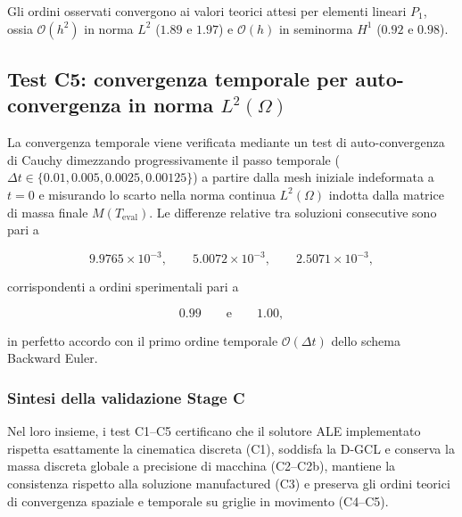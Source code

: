 Gli ordini osservati convergono ai valori teorici attesi per elementi lineari $P_1$, ossia $\mathcal{O}(h^2)$ in norma $L^2$ ($1.89$ e $1.97$) e $\mathcal{O}(h)$ in seminorma $H^1$ ($0.92$ e $0.98$).

\subsection{Test C5: convergenza temporale per auto-convergenza in norma \texorpdfstring{$L^2(\Omega)$}{L2(Ω)}}
\label{subsubsec:c5}

La convergenza temporale viene verificata mediante un test di auto-convergenza di Cauchy dimezzando progressivamente il passo temporale ($\Delta t \in \{0.01, 0.005, 0.0025, 0.00125\}$) a partire dalla mesh iniziale indeformata a $t=0$ e misurando lo scarto nella norma continua $L^2(\Omega)$ indotta dalla matrice di massa finale $M(T_{\mathrm{eval}})$. Le differenze relative tra soluzioni consecutive sono pari a

\[
9.9765\times10^{-3},
\qquad
5.0072\times10^{-3},
\qquad
2.5071\times10^{-3},
\]

corrispondenti a ordini sperimentali pari a

\[
0.99
\qquad\text{e}\qquad
1.00,
\]

in perfetto accordo con il primo ordine temporale $\mathcal{O}(\Delta t)$ dello schema Backward Euler.

\subsubsection{Sintesi della validazione Stage C}

Nel loro insieme, i test C1--C5 certificano che il solutore ALE implementato rispetta esattamente la cinematica discreta (C1), soddisfa la D-GCL e conserva la massa discreta globale a precisione di macchina (C2--C2b), mantiene la consistenza rispetto alla soluzione manufactured (C3) e preserva gli ordini teorici di convergenza spaziale e temporale su griglie in movimento (C4--C5).
